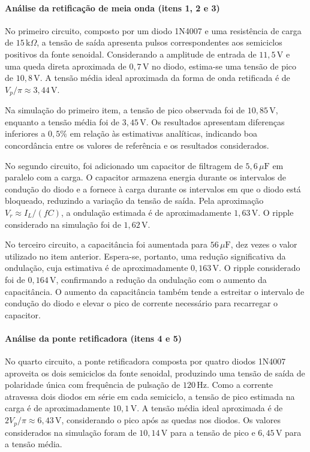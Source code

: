 \documentclass[11pt,a4paper]{article}
\begin{document}
\paragraph{Análise da retificação de meia onda (itens 1, 2 e 3)}

No primeiro circuito, composto por um diodo 1N4007 e uma resistência de carga de $15\,\text{k}\Omega$, a tensão de saída apresenta pulsos correspondentes aos semiciclos positivos da fonte senoidal. Considerando a amplitude de entrada de $11{,}5\,\text{V}$ e uma queda direta aproximada de $0{,}7\,\text{V}$ no diodo, estima-se uma tensão de pico de $10{,}8\,\text{V}$. A tensão média ideal aproximada da forma de onda retificada é de $V_p/\pi\approx3{,}44\,\text{V}$.

Na simulação do primeiro item, a tensão de pico observada foi de $10{,}85\,\text{V}$, enquanto a tensão média foi de $3{,}45\,\text{V}$. Os resultados apresentam diferenças inferiores a $0{,}5\%$ em relação às estimativas analíticas, indicando boa concordância entre os valores de referência e os resultados considerados.

No segundo circuito, foi adicionado um capacitor de filtragem de $5{,}6\,\mu\text{F}$ em paralelo com a carga. O capacitor armazena energia durante os intervalos de condução do diodo e a fornece à carga durante os intervalos em que o diodo está bloqueado, reduzindo a variação da tensão de saída. Pela aproximação $V_r\approx I_L/(fC)$, a ondulação estimada é de aproximadamente $1{,}63\,\text{V}$. O ripple considerado na simulação foi de $1{,}62\,\text{V}$.

No terceiro circuito, a capacitância foi aumentada para $56\,\mu\text{F}$, dez vezes o valor utilizado no item anterior. Espera-se, portanto, uma redução significativa da ondulação, cuja estimativa é de aproximadamente $0{,}163\,\text{V}$. O ripple considerado foi de $0{,}164\,\text{V}$, confirmando a redução da ondulação com o aumento da capacitância. O aumento da capacitância também tende a estreitar o intervalo de condução do diodo e elevar o pico de corrente necessário para recarregar o capacitor.

\paragraph{Análise da ponte retificadora (itens 4 e 5)}

No quarto circuito, a ponte retificadora composta por quatro diodos 1N4007 aproveita os dois semiciclos da fonte senoidal, produzindo uma tensão de saída de polaridade única com frequência de pulsação de $120\,\text{Hz}$. Como a corrente atravessa dois diodos em série em cada semiciclo, a tensão de pico estimada na carga é de aproximadamente $10{,}1\,\text{V}$. A tensão média ideal aproximada é de $2V_p/\pi\approx6{,}43\,\text{V}$, considerando o pico após as quedas nos diodos. Os valores considerados na simulação foram de $10{,}14\,\text{V}$ para a tensão de pico e $6{,}45\,\text{V}$ para a tensão média.
\end{document}
